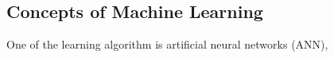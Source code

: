 \subsection{Concepts of Machine Learning}
One of the learning algorithm is artificial neural networks (ANN),